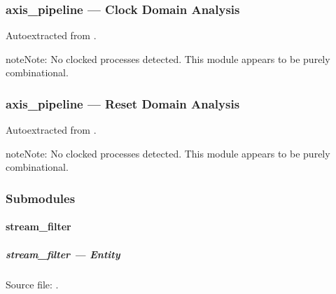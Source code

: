 \documentclass[letterpaper,10pt,english]{sphinxmanual}
\begin{document}
\sphinxstepscope


\subsubsection{axis\_pipeline — Clock Domain Analysis}
\label{\detokenize{modules/axis_pipeline/cdc:axis-pipeline-clock-domain-analysis}}\label{\detokenize{modules/axis_pipeline/cdc::doc}}
\sphinxAtStartPar
Auto\sphinxhyphen{}extracted from .

\begin{sphinxadmonition}{note}{Note:}
\sphinxAtStartPar
No clocked processes detected. This module appears to be purely combinational.
\end{sphinxadmonition}

\sphinxstepscope


\subsubsection{axis\_pipeline — Reset Domain Analysis}
\label{\detokenize{modules/axis_pipeline/reset:axis-pipeline-reset-domain-analysis}}\label{\detokenize{modules/axis_pipeline/reset::doc}}
\sphinxAtStartPar
Auto\sphinxhyphen{}extracted from .

\begin{sphinxadmonition}{note}{Note:}
\sphinxAtStartPar
No clocked processes detected. This module appears to be purely combinational.
\end{sphinxadmonition}


\subsubsection{Submodules}
\label{\detokenize{modules/axis_pipeline/index:submodules}}
\sphinxstepscope


\paragraph{stream\_filter}
\label{\detokenize{modules/stream_filter/index:stream-filter}}\label{\detokenize{modules/stream_filter/index::doc}}
\sphinxstepscope


\subparagraph{stream\_filter — Entity}
\label{\detokenize{modules/stream_filter/entity:stream-filter-entity}}\label{\detokenize{modules/stream_filter/entity::doc}}
\sphinxAtStartPar
Source file: .
\end{document}
